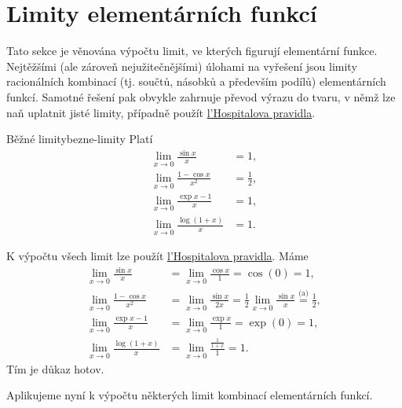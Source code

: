 \section{Limity elementárních funkcí}
\label{sec:limity-elementarnich-funkci}

Tato sekce je věnována výpočtu limit, ve kterých figurují elementární funkce.
Nejtěžšími (ale zároveň nejužitečnějšími) úlohami na vyřešení jsou limity
racionálních kombinací (tj. součtů, násobků a především podílů) elementárních
funkcí. Samotné řešení pak obvykle zahrnuje převod výrazu do tvaru, v němž lze
naň uplatnit jisté  limity, případně použít
\hyperref[thm:lhospital]{l'Hospitalova pravidla}.

\begin{proposition}{Běžné limity}{bezne-limity}
 Platí
 \begingroup
 \addtolength{\jot}{3mm}
 \begin{align}
  \lim_{x \to 0} \frac{\sin x}{x} &= 1,\tag{a}\\
  \lim_{x \to 0} \frac{1-\cos x}{x^2} &= \frac{1}{2},\tag{b}\\
  \lim_{x \to 0} \frac{\exp x - 1}{x} &= 1,\tag{c}\\
  \lim_{x \to 0} \frac{\log(1+x)}{x} &= 1.\tag{d}
 \end{align}
 \endgroup
\end{proposition}
\begin{propproof}
 K výpočtu všech limit lze použít \hyperref[thm:lhospital]{l'Hospitalova
 pravidla}. Máme
 \begingroup
 \addtolength{\jot}{3mm}
 \begin{align}
  \lim_{x \to 0} \frac{\sin x}{x} &= \lim_{x \to 0} \frac{\cos x}{1} = \cos(0) =
  1,\tag{a}\\
  \lim_{x \to 0} \frac{1-\cos x}{x^2} &= \lim_{x \to 0} \frac{\sin x}{2x} =
  \frac{1}{2} \lim_{x \to 0} \frac{\sin x}{x} \overset{\text{(a)}}{=}
  \frac{1}{2},\tag{b}\\
  \lim_{x \to 0} \frac{\exp x - 1}{x} &= \lim_{x \to 0} \frac{\exp x}{1} =
  \exp(0) = 1,\tag{c}\\
  \lim_{x \to 0} \frac{\log(1+x)}{x} &= \lim_{x \to 0} \frac{\frac{1}{1+x}}{1} =
  1.\tag{d}
 \end{align}
 \endgroup
 Tím je důkaz hotov.
\end{propproof}

Aplikujeme nyní  k výpočtu některých limit
kombinací elementárních funkcí.

